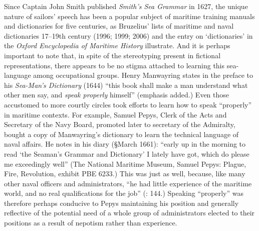 Since Captain John Smith published \textit{Smith’s Sea Grammar} in 1627, the unique nature of sailors’ speech has been a popular subject of maritime training manuals and dictionaries for five centuries, as Bruzelius’ lists of maritime and naval dictionaries 17--19th century (1996; 1999; 2006) and the entry on ‘dictionaries’ in the \textit{Oxford Encyclopedia of Maritime History} \citep{Hattendorf2007} illustrate. And it is perhaps important to note that, in spite of the stereotyping present in fictional representations, there appears to be no stigma attached to learning this sea-language among occupational groups. Henry Manwayring states in the preface to his \textit{Sea-Man’s Dictionary} (1644) “this book shall make a man understand what other men say, and \textit{speak properly} himself” (emphasis added.) Even those accustomed to more courtly circles took efforts to learn how to speak “properly” in maritime contexts. For example, Samuel Pepys, Clerk of the Acts and Secretary of the Navy Board, promoted later to secretary of the Admiralty, bought a copy of Manwayring’s dictionary to learn the technical language of naval affairs. He notes in his diary (§March {1661}): “early up in the morning to read ‘the Seaman’s Grammar and Dictionary’ I lately have got, which do please me exceedingly well” (The National Maritime Museum, Samuel Pepys: Plague, Fire, Revolution, exhibit PBE 6233.)  This was just as well, because, like many other naval officers and administrators, “he had little experience of the maritime world, and no real qualifications for the job” (\citealt{Lincoln2015}: 144.) Speaking “properly” was therefore perhaps conducive to Pepys maintaining his position and generally reflective of the potential need of a whole group of administrators elected to their positions as a result of nepotism rather than experience. 

